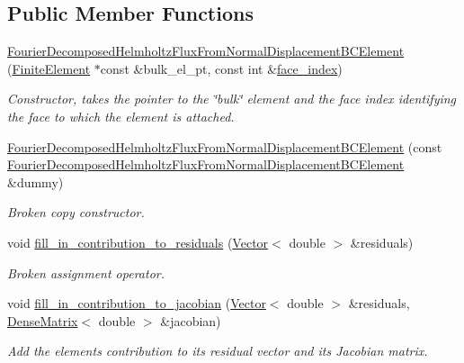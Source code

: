\subsection*{Public Member Functions}
\begin{DoxyCompactItemize}
\item 
\hyperlink{classoomph_1_1FourierDecomposedHelmholtzFluxFromNormalDisplacementBCElement_a01e66914352ffdf578cc6ebcfa760dd4}{Fourier\+Decomposed\+Helmholtz\+Flux\+From\+Normal\+Displacement\+B\+C\+Element} (\hyperlink{classoomph_1_1FiniteElement}{Finite\+Element} $\ast$const \&bulk\+\_\+el\+\_\+pt, const int \&\hyperlink{classoomph_1_1FaceElement_a478d577ac6db67ecc80f1f02ae3ab170}{face\+\_\+index})
\begin{DoxyCompactList}\small\item\em Constructor, takes the pointer to the \char`\"{}bulk\char`\"{} element and the face index identifying the face to which the element is attached. \end{DoxyCompactList}\item 
\hyperlink{classoomph_1_1FourierDecomposedHelmholtzFluxFromNormalDisplacementBCElement_aafab69b927f48ec192cf48cf7fde7712}{Fourier\+Decomposed\+Helmholtz\+Flux\+From\+Normal\+Displacement\+B\+C\+Element} (const \hyperlink{classoomph_1_1FourierDecomposedHelmholtzFluxFromNormalDisplacementBCElement}{Fourier\+Decomposed\+Helmholtz\+Flux\+From\+Normal\+Displacement\+B\+C\+Element} \&dummy)
\begin{DoxyCompactList}\small\item\em Broken copy constructor. \end{DoxyCompactList}\item 
void \hyperlink{classoomph_1_1FourierDecomposedHelmholtzFluxFromNormalDisplacementBCElement_a9fb0fe9492372a7687b6e30b00d257c1}{fill\+\_\+in\+\_\+contribution\+\_\+to\+\_\+residuals} (\hyperlink{classoomph_1_1Vector}{Vector}$<$ double $>$ \&residuals)
\begin{DoxyCompactList}\small\item\em Broken assignment operator. \end{DoxyCompactList}\item 
void \hyperlink{classoomph_1_1FourierDecomposedHelmholtzFluxFromNormalDisplacementBCElement_a721d81ba5e0e9c8d811303e7a9ce5a8a}{fill\+\_\+in\+\_\+contribution\+\_\+to\+\_\+jacobian} (\hyperlink{classoomph_1_1Vector}{Vector}$<$ double $>$ \&residuals, \hyperlink{classoomph_1_1DenseMatrix}{Dense\+Matrix}$<$ double $>$ \&jacobian)
\begin{DoxyCompactList}\small\item\em Add the element\textquotesingle{}s contribution to its residual vector and its Jacobian matrix. \end{DoxyCompactList}\item 

\end{DoxyCompactItemize}

